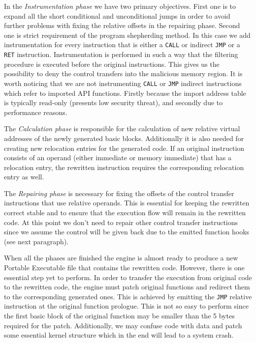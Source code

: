 \documentclass[10pt,twocolumn,a4paper]{article}
\begin{document}
In the {\emph{Instrumentation phase}} we have two primary objectives. First one is to expand all the short conditional and unconditional jumps in order to avoid further problems with fixing the relative offsets in the repairing phase. Second one is strict requirement of the program shepherding method. In this case we add instrumentation for every instruction that is either a {\tt{CALL}} or indirect {\tt{JMP}} or a {\tt{RET}} instruction. Instrumentation is performed in such a way that the filtering procedure is executed before the original instructions. This gives us the possibility to deny the control transfers into the malicious memory region. It is worth noticing that we are not instrumenting {\tt{CALL}} or {\tt{JMP}} indirect instructions which refer to imported API functions. Firstly because the import address table is typically read-only (presents low security threat), and secondly due to performance reasons.

The {\emph{Calculation phase}} is responsible for the calculation of new relative virtual addresses of the newly generated basic blocks. Additionally it is also needed for creating new relocation entries for the generated code. If an original instruction consists of an operand (either immediate or memory immediate) that has a relocation entry, the rewritten instruction requires the corresponding relocation entry as well.

The {\emph{Repairing phase}} is necessary for fixing the offsets of the control transfer instructions that use relative operands. This is essential for keeping the rewritten correct stable and to ensure that the execution flow will remain in the rewritten code. At this point we don't need to repair other control transfer instructions since we assume the control will be given back due to the emitted function hooks (see next paragraph).

When all the phases are finished the engine is almost ready to produce a new Portable Executable file that contains the rewritten code. However, there is one essential step yet to perform. In order to transfer the execution from original code to the rewritten code, the engine must patch original functions and redirect them to the corresponding generated ones. This is achieved by emitting the {\tt{JMP}} relative instruction at the original function prologue. This is not so easy to perform since the first basic block of the original function may be smaller than the 5 bytes required for the patch. Additionally, we may confuse code with data and patch some essential kernel structure which in the end will lead to a system crash. 
\end{document}
